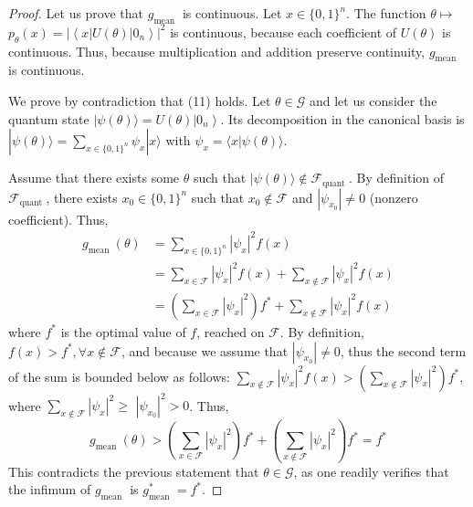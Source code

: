 \begin{proof}
Let us prove that $g_{\text {mean }}$ is continuous.
Let $x \in\{0,1\}^{n}$. The function $\theta \mapsto$ $p_{\theta}(x)=\left|\left\langle x|U(\theta)| 0_{n}\right\rangle\right|^{2}$ is continuous, because each coefficient of $U(\theta)$ is continuous. Thus, because multiplication and addition preserve continuity, $g_{\text {mean }}$ is continuous.

We prove by contradiction that (11) holds.
Let $\theta \in \mathcal{G}$ and let us consider the quantum state $|\psi(\theta)\rangle=U(\theta)\left|0_{n}\right\rangle$. Its decomposition in the canonical basis is $|\psi(\theta)\rangle=\sum_{x \in\{0,1\}^{n}} \psi_{x}|x\rangle$ with $\psi_{x}=\langle x|\psi(\theta)\rangle$. %

Assume that there exists some $\theta$ such that $|\psi(\theta)\rangle \notin \mathcal{F}_{\text {quant }}$. By definition of $\mathcal{F}_{\text {quant }}$, there exists $x_{0} \in\{0,1\}^{n}$ such that $x_{0} \notin \mathcal{F}$ and $\left|\psi_{x_{0}}\right| \neq 0$ (nonzero coefficient). Thus,
$$
\begin{aligned}
g_{\text {mean }}(\theta) & =\sum_{x \in\{0,1\}^{n}}\left|\psi_{x}\right|^{2} f(x) \\
& =\sum_{x \in \mathcal{F}}\left|\psi_{x}\right|^{2} f(x)+\sum_{x \notin \mathcal{F}}\left|\psi_{x}\right|^{2} f(x) \\
& =\left(\sum_{x \in \mathcal{F}}\left|\psi_{x}\right|^{2}\right) f^{*}+\sum_{x \notin \mathcal{F}}\left|\psi_{x}\right|^{2} f(x)
\end{aligned}
$$
where $f^{*}$ is the optimal value of $f$, reached on $\mathcal{F}$. By definition, $f(x)>f^{*}, \forall x \notin \mathcal{F}$, and because we assume that $\left|\psi_{x_{0}}\right| \neq 0$, thus the second term of the sum is bounded below as follows: $\sum_{x \notin \mathcal{F}}\left|\psi_{x}\right|^{2} f(x)>\left(\sum_{x \notin \mathcal{F}}\left|\psi_{x}\right|^{2}\right) f^{*}$, where $\sum_{x \notin \mathcal{F}}\left|\psi_{x}\right|^{2} \geq$ $\left|\psi_{x_{0}}\right|^{2}>0$. Thus,
$$
g_{\text {mean }}(\theta)>\left(\sum_{x \in \mathcal{F}}\left|\psi_{x}\right|^{2}\right) f^{*}+\left(\sum_{x \notin \mathcal{F}}\left|\psi_{x}\right|^{2}\right) f^{*}=f^{*}
$$
This contradicts the previous statement that $\theta \in \mathcal{G}$, as one readily verifies that the infimum of $g_{\text {mean }}$ is $g_{\text {mean }}^{*}=f^{*}$.
\end{proof}

